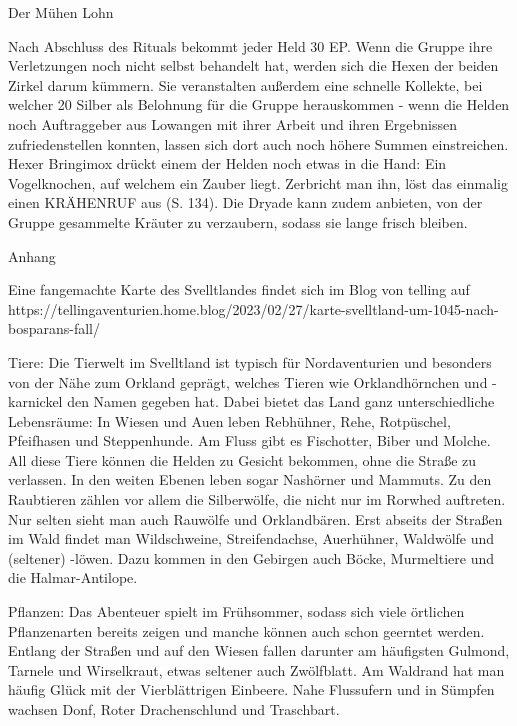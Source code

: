Der Mühen Lohn

Nach Abschluss des Rituals bekommt jeder Held 30 EP. Wenn die Gruppe ihre Verletzungen noch nicht selbst behandelt hat, werden sich die Hexen der beiden Zirkel darum kümmern. Sie veranstalten außerdem eine schnelle Kollekte, bei welcher 20 Silber als Belohnung für die Gruppe herauskommen - wenn die Helden noch Auftraggeber aus Lowangen mit ihrer Arbeit und ihren Ergebnissen zufriedenstellen konnten, lassen sich dort auch noch höhere Summen einstreichen. 
Hexer Bringimox drückt einem der Helden noch etwas in die Hand: Ein Vogelknochen, auf welchem ein Zauber liegt. Zerbricht man ihn, löst das einmalig einen KRÄHENRUF aus (S. 134). Die Dryade kann zudem anbieten, von der Gruppe gesammelte Kräuter zu verzaubern, sodass sie lange frisch bleiben.












Anhang

Eine fangemachte Karte des Svelltlandes findet sich im Blog von telling auf https://tellingaventurien.home.blog/2023/02/27/karte-svelltland-um-1045-nach-bosparans-fall/

Tiere:
Die Tierwelt im Svelltland ist typisch für Nordaventurien und besonders von der Nähe zum Orkland geprägt, welches Tieren wie Orklandhörnchen und -karnickel den Namen gegeben hat. Dabei bietet das Land ganz unterschiedliche Lebensräume: In Wiesen und Auen leben Rebhühner, Rehe, Rotpüschel, Pfeifhasen und Steppenhunde. Am Fluss gibt es Fischotter, Biber und Molche. All diese Tiere können die Helden zu Gesicht bekommen, ohne die Straße zu verlassen. In den weiten Ebenen leben sogar Nashörner und Mammuts.
Zu den Raubtieren zählen vor allem die Silberwölfe, die nicht nur im Rorwhed auftreten. Nur selten sieht man auch Rauwölfe und Orklandbären.
Erst abseits der Straßen im Wald findet man Wildschweine, Streifendachse, Auerhühner, Waldwölfe und (seltener) -löwen. Dazu kommen in den Gebirgen auch Böcke, Murmeltiere und die Halmar-Antilope.

Pflanzen:
Das Abenteuer spielt im Frühsommer, sodass sich viele örtlichen Pflanzenarten bereits zeigen und manche können auch schon geerntet werden. Entlang der Straßen und auf den Wiesen fallen darunter am häufigsten Gulmond, Tarnele und Wirselkraut, etwas seltener auch Zwölfblatt.
Am Waldrand hat man häufig Glück mit der Vierblättrigen Einbeere.
Nahe Flussufern und in Sümpfen wachsen Donf, Roter Drachenschlund und Traschbart.


